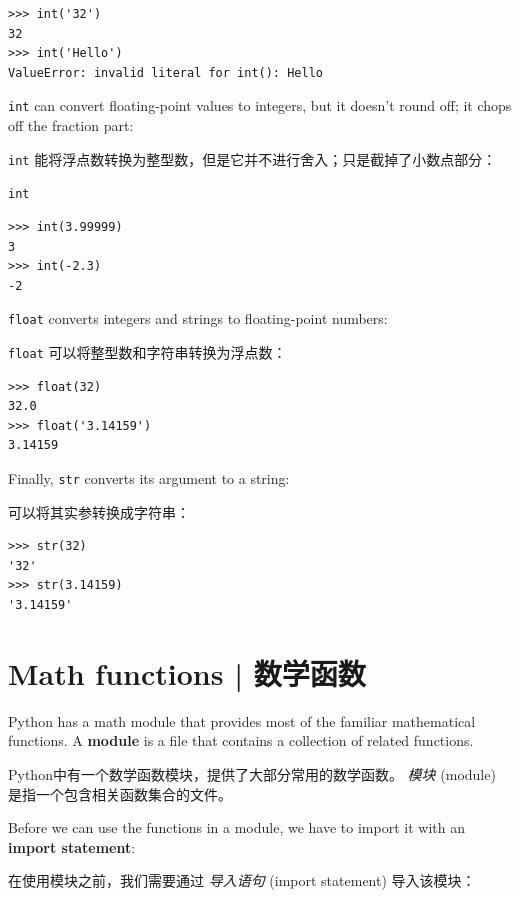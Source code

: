 \begin{lstlisting}
>>> int('32')
32
>>> int('Hello')
ValueError: invalid literal for int(): Hello
\end{lstlisting}

%
{\tt int} can convert floating-point values to integers, but it
doesn't round off; it chops off the fraction part:

\lstinline{int}  能将浮点数转换为整型数，但是它并不进行舍入；只是截掉了小数点部分：

\lstinline{int}

\begin{lstlisting}
>>> int(3.99999)
3
>>> int(-2.3)
-2
\end{lstlisting}
%
{\tt float} converts integers and strings to floating-point
numbers:

\lstinline{float} 可以将整型数和字符串转换为浮点数：
  
  

\begin{lstlisting}
>>> float(32)
32.0
>>> float('3.14159')
3.14159
\end{lstlisting}
%
Finally, {\tt str} converts its argument to a string:

可以将其实参转换成字符串：
  
  

\begin{lstlisting}
>>> str(32)
'32'
>>> str(3.14159)
'3.14159'
\end{lstlisting}

%
\section{Math functions  |  数学函数}
  
  


Python has a math module that provides most of the familiar
mathematical functions.  A {\bf module} is a file that contains a
collection of related functions.

Python中有一个数学函数模块，提供了大部分常用的数学函数。
\emph{模块} (module) 是指一个包含相关函数集合的文件。
  
  

Before we can use the functions in a module, we have to import it with
an {\bf import statement}:

在使用模块之前，我们需要通过 \emph{导入语句} (import statement) 导入该模块：

